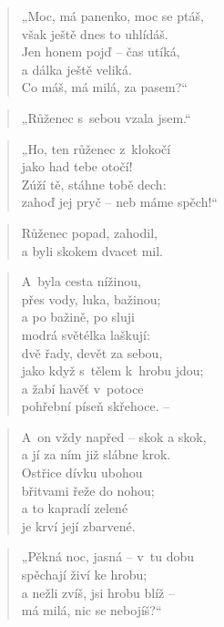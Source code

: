 \begin{verse}
„Moc, má panenko, moc se ptáš, \\
však ještě dnes to uhlídáš. \\
Jen honem pojď -- čas utíká, \\
a dálka ještě veliká. \\
Co máš, má milá, za pasem?“
\end{verse}

\begin{verse}
„Růženec s~sebou vzala jsem.“
\end{verse}

\begin{verse}
„Ho, ten růženec z~klokočí \\
jako had tebe otočí! \\
Zúží tě, stáhne tobě dech: \\
zahoď jej pryč -- neb máme spěch!“
\end{verse}

\begin{verse}
Růženec popad, zahodil, \\
a byli skokem dvacet mil.
\end{verse}

\begin{verse}
A~byla cesta nížinou, \\
přes vody, luka, bažinou; \\
a po bažině, po sluji \\
modrá světélka laškují: \\
dvě řady, devět za sebou, \\
jako když s~tělem k~hrobu jdou; \\
a žabí havěť v~potoce \\
pohřební píseň skřehoce. --
\end{verse}

\begin{verse}
A~on vždy napřed -- skok a skok, \\
a jí za ním již slábne krok. \\
Ostřice dívku ubohou \\
břitvami řeže do nohou; \\
a to kapradí zelené \\
je krví její zbarvené.
\end{verse}

\begin{verse}
„Pěkná noc, jasná -- v~tu dobu \\
spěchají živí ke hrobu; \\
a nežli zvíš, jsi hrobu blíž -- \\
má milá, nic se nebojíš?“
\end{verse}

